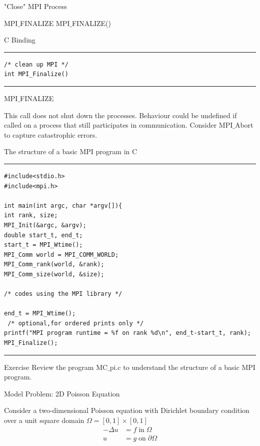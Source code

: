 \documentclass[xcolor=dvipsnames]{beamer}
\begin{document}
\begin{frame}[fragile]{"Close" MPI Process}
\begin{block}{MPI$\_$FINALIZE}
MPI$\_$FINALIZE()
\end{block}

C Binding
\rule{\textwidth}{1pt}
\scriptsize
\begin{verbatim}
/* clean up MPI */
int MPI_Finalize()
\end{verbatim}
\rule{\textwidth}{1pt}
\end{frame}

\begin{frame}{MPI$\_$FINALIZE}
\begin{outline}
\1 This call does not shut down the processes.
\2 Behaviour could be undefined if called on a process that still participates in communication.
\2 Consider MPI$\_$Abort to capture catastrophic errors.
\end{outline}
\end{frame}


\begin{frame}[fragile]{The structure of a basic MPI program in C}
\rule{\textwidth}{1pt}
\scriptsize
\begin{verbatim}
#include<stdio.h>
#include<mpi.h>

int main(int argc, char *argv[]){
int rank, size;
MPI_Init(&argc, &argv);
double start_t, end_t;
start_t = MPI_Wtime();
MPI_Comm world = MPI_COMM_WORLD;
MPI_Comm_rank(world, &rank);
MPI_Comm_size(world, &size);

/* codes using the MPI library */

end_t = MPI_Wtime();
 /* optional,for ordered prints only */ 
printf("MPI program runtime = %f on rank %d\n", end_t-start_t, rank);
MPI_Finalize();
\end{verbatim}
\rule{\textwidth}{1pt}
\end{frame}

\begin{frame}{Exercise}
Review the program MC$\_$pi.c to understand the structure of a basic MPI program.
\end{frame}

\begin{frame}{Model Problem: 2D Poisson Equation}
\begin{block}{}
Consider a two-dimensional Poisson equation with Dirichlet boundary condition over a unit square domain $\Omega = [0,1] \times [0,1]$
\begin{align*}
-\Delta u &= f \; \text{in} \; \Omega \\
 u &= g \; \text{on} \; \partial \Omega
\end{align*}
\end{block}
\end{frame}
\end{document}
